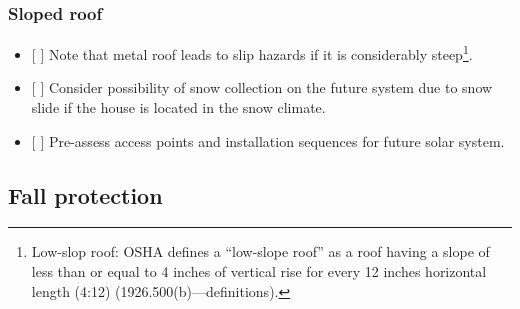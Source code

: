 \documentclass[]{article}
\providecommand{\tightlist}{%
  \setlength{\itemsep}{0pt}\setlength{\parskip}{0pt}}
\let\rmarkdownfootnote\footnote%
\def\footnote{\protect\rmarkdownfootnote}
\begin{document}
\hypertarget{sloped-roof}{%
\subsubsection{Sloped roof}\label{sloped-roof}}

\begin{itemize}
\tightlist
\item
  {[} {]} Note that metal roof leads to slip hazards if it is
  considerably steep\footnote{Low-slop roof: OSHA defines a ``low-slope
    roof'' as a roof having a slope of less than or equal to 4 inches of
    vertical rise for every 12 inches horizontal length (4:12)
    (1926.500(b)---definitions).}.
\item
  {[} {]} Consider possibility of snow collection on the future system
  due to snow slide if the house is located in the snow climate.
\item
  {[} {]} Pre-assess access points and installation sequences for future
  solar system.
\end{itemize}

\hypertarget{fall-protection-1}{%
\subsection{Fall protection}\label{fall-protection-1}}
\end{document}
